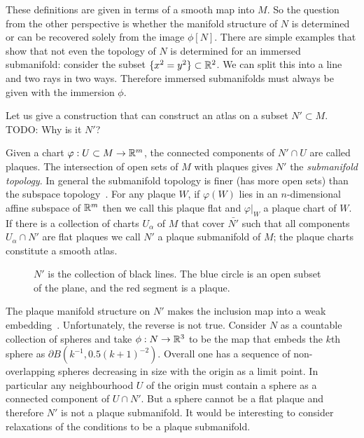 These definitions are given in terms of a smooth map into $M$.
So the question from the other perspective is whether the manifold structure of $N$ is determined or can be recovered solely from the image $\phi[N]$.
There are simple examples that show that not even the topology of $N$ is determined for an immersed submanifold: consider the subset $\{x^2 = y^2\} \subset \mathbb{R}^2$.
We can split this into a line and two rays in two ways.
Therefore immersed submanifolds must always be given with the immersion $\phi$.

Let us give a construction that can construct an atlas on a subset $N' \subset M$. TODO: Why is it $N'$?

\begin{definition}
\label{def:plaque submanifold}
\textup{\cite[Def~1.2.1,1.2.2,Thm~1.2.7]{Sharpe1997}}
Given a chart $\varphi: U \subset M \to \mathbb{R}^m$, the connected components of $N'\cap U$ are called plaques.
The intersection of open sets of $M$ with plaques gives $N'$ the \emph{submanifold topology}.
In general the submanifold topology is finer (has more open sets) than the subspace topology~\cite[Def~1.2.4]{Sharpe1997}.
For any plaque $W$, if $\varphi(W)$ lies in an $n$-dimensional affine subspace of $\mathbb{R}^m$ then we call this plaque flat and $\varphi|_W$ a plaque chart of $W$.
If there is a collection of charts $U_\alpha$ of $M$ that cover $\bar{N'}$ such that all components $U_\alpha\cap N'$ are flat plaques
we call $N'$ a plaque submanifold of $M$; the plaque charts constitute a smooth atlas.
\end{definition}

\begin{figure}[h]
\begin{center}
\caption{$N'$ is the collection of black lines. The blue circle is an open subset of the plane, and the red segment is a plaque.}
\end{center}
\end{figure}

The plaque manifold structure on $N'$ makes the inclusion map into a weak embedding~\cite[Thm~1.2.7]{Sharpe1997}.
Unfortunately, the reverse is not true.
Consider $N$ as a countable collection of spheres and take $\phi : N \to \mathbb{R}^3$ to be the map that embeds the $k$th sphere as $\partial B(k^{-1}, 0.5(k+1)^{-2})$.
Overall one has a sequence of non-overlapping spheres decreasing in size with the origin as a limit point.
In particular any neighbourhood $U$ of the origin must contain a sphere as a connected component of $U \cap N'$.
But a sphere cannot be a flat plaque and therefore $N'$ is not a plaque submanifold.
It would be interesting to consider relaxations of the conditions to be a plaque submanifold.

